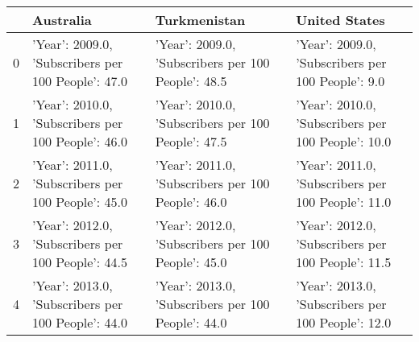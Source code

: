 \begin{tabular}{llll}
\toprule
 & Australia & Turkmenistan & United States \\
\midrule
0 & {'Year': 2009.0, 'Subscribers per 100 People': 47.0} & {'Year': 2009.0, 'Subscribers per 100 People': 48.5} & {'Year': 2009.0, 'Subscribers per 100 People': 9.0} \\
1 & {'Year': 2010.0, 'Subscribers per 100 People': 46.0} & {'Year': 2010.0, 'Subscribers per 100 People': 47.5} & {'Year': 2010.0, 'Subscribers per 100 People': 10.0} \\
2 & {'Year': 2011.0, 'Subscribers per 100 People': 45.0} & {'Year': 2011.0, 'Subscribers per 100 People': 46.0} & {'Year': 2011.0, 'Subscribers per 100 People': 11.0} \\
3 & {'Year': 2012.0, 'Subscribers per 100 People': 44.5} & {'Year': 2012.0, 'Subscribers per 100 People': 45.0} & {'Year': 2012.0, 'Subscribers per 100 People': 11.5} \\
4 & {'Year': 2013.0, 'Subscribers per 100 People': 44.0} & {'Year': 2013.0, 'Subscribers per 100 People': 44.0} & {'Year': 2013.0, 'Subscribers per 100 People': 12.0} \\
\bottomrule
\end{tabular}
